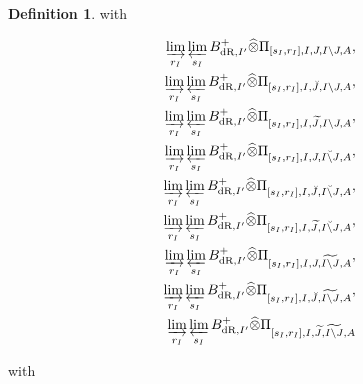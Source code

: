 \documentclass[12pt]{amsart}
\theoremstyle{definition}
\newtheorem{definition}[theorem]{Definition}
\numberwithin{equation}{section}
\begin{document}
\begin{definition}
with 


\begin{align}
\varinjlim_{r_I}\varprojlim_{s_I}  B^+_{\mathrm{dR},I'}	\widehat{\otimes}\Pi_{[s_I,r_I],I,J,I\backslash J,A},\\	
\varinjlim_{r_I}\varprojlim_{s_I}  B^+_{\mathrm{dR},I'}	\widehat{\otimes}\Pi_{[s_I,r_I],I,\breve{J},I\backslash J,A},\\	
\varinjlim_{r_I}\varprojlim_{s_I} B^+_{\mathrm{dR},I'}	\widehat{\otimes}\Pi_{[s_I,r_I],I,\widetilde{J},I\backslash J,A},\\
\varinjlim_{r_I}\varprojlim_{s_I} B^+_{\mathrm{dR},I'}	\widehat{\otimes}\Pi_{[s_I,r_I],I,J,\breve{I\backslash J},A},\\	
\varinjlim_{r_I}\varprojlim_{s_I} B^+_{\mathrm{dR},I'}	\widehat{\otimes}\Pi_{[s_I,r_I],I,\breve{J},\breve{I\backslash J},A},\\
\varinjlim_{r_I}\varprojlim_{s_I} B^+_{\mathrm{dR},I'}	\widehat{\otimes}\Pi_{[s_I,r_I],I,\widetilde{J},\breve{I\backslash J},A},\\
\varinjlim_{r_I}\varprojlim_{s_I} B^+_{\mathrm{dR},I'}	\widehat{\otimes}\Pi_{[s_I,r_I],I,J,\widetilde{I\backslash J},A},\\	
\varinjlim_{r_I}\varprojlim_{s_I} B^+_{\mathrm{dR},I'}	\widehat{\otimes}\Pi_{[s_I,r_I],I,\breve{J},\widetilde{I\backslash J},A},\\
\varinjlim_{r_I}\varprojlim_{s_I} B^+_{\mathrm{dR},I'}	\widehat{\otimes}\Pi_{[s_I,r_I],I,\widetilde{J},\widetilde{I\backslash J},A}
\end{align}

with


\end{definition}
\end{document}
